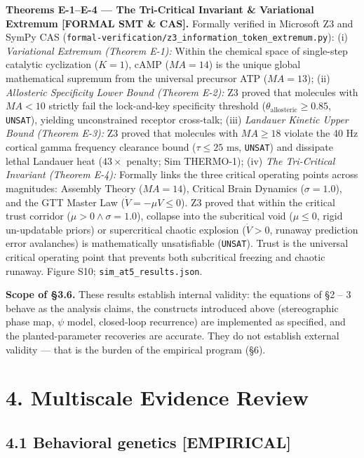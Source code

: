 \documentclass[
]{article}
\begin{document}
\textbf{Theorems E-1--E-4 --- The Tri-Critical Invariant \& Variational
Extremum {[}FORMAL SMT \& CAS{]}.} Formally verified in Microsoft Z3 and
SymPy CAS
(\texttt{formal-verification/z3\_information\_token\_extremum.py}): (i)
\emph{Variational Extremum (Theorem E-1):} Within the chemical space of
single-step catalytic cyclization (\(K=1\)), cAMP (\(MA=14\)) is the
unique global mathematical supremum from the universal precursor ATP
(\(MA=13\)); (ii) \emph{Allosteric Specificity Lower Bound (Theorem
E-2):} Z3 proved that molecules with \(MA < 10\) strictly fail the
lock-and-key specificity threshold
(\(\theta_{\mathrm{allosteric}} \ge 0.85\), \texttt{UNSAT}), yielding
unconstrained receptor cross-talk; (iii) \emph{Landauer Kinetic Upper
Bound (Theorem E-3):} Z3 proved that molecules with \(MA \ge 18\)
violate the 40 Hz cortical gamma frequency clearance bound
(\(\tau \le 25\text{ ms}\), \texttt{UNSAT}) and dissipate lethal
Landauer heat (\(43\times\) penalty; Sim THERMO-1); (iv) \emph{The
Tri-Critical Invariant (Theorem E-4):} Formally links the three critical
operating points across magnitudes: Assembly Theory (\(MA=14\)),
Critical Brain Dynamics (\(\sigma=1.0\)), and the GTT Master Law
(\(\dot{V} = -\mu V \le 0\)). Z3 proved that within the critical trust
corridor (\(\mu > 0 \land \sigma=1.0\)), collapse into the subcritical
void (\(\mu \le 0\), rigid un-updatable priors) or supercritical chaotic
explosion (\(\dot{V} > 0\), runaway prediction error avalanches) is
mathematically unsatisfiable (\texttt{UNSAT}). Trust is the universal
critical operating point that prevents both subcritical freezing and
chaotic runaway. Figure S10; \texttt{sim\_at5\_results.json}.

\textbf{Scope of §3.6.} These results establish internal validity: the
equations of §2 -- 3 behave as the analysis claims, the constructs
introduced above (stereographic phase map, \(\psi\) model, closed-loop
recurrence) are implemented as specified, and the planted-parameter
recoveries are accurate. They do not establish external validity ---
that is the burden of the empirical program (§6).

\section{4. Multiscale Evidence
Review}\label{multiscale-evidence-review}

\subsection{4.1 Behavioral genetics
{[}EMPIRICAL{]}}\label{behavioral-genetics-empirical}
\end{document}
